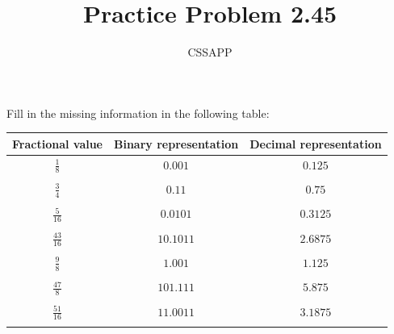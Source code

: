\documentclass{article}
\title{Practice Problem 2.45}
\author{CSSAPP}
\begin{document}
    \maketitle
    \begin{flushleft}
        Fill in the missing information in the following table:
        \smallbreak
        \begin{tabular}{ccc}
            \textbf{Fractional value}   & \textbf{Binary representation}    & \textbf{Decimal representation}\\
            \midrule
            $\frac{1}{8}$    & $0.001$    & $0.125$\\ \\
            $\frac{3}{4}$    & $0.11$     & $0.75$\\ \\
            $\frac{5}{16}$   & $0.0101$   & $0.3125$\\ \\
            $\frac{43}{16}$  & $10.1011$  & $2.6875$\\ \\
            $\frac{9}{8}$    & $1.001$    & $1.125$\\ \\
            $\frac{47}{8}$   & $101.111$  & $5.875$\\ \\
            $\frac{51}{16}$  & $11.0011$  & $3.1875$\\ \\
            
        \end{tabular}
    \end{flushleft}
\end{document}
